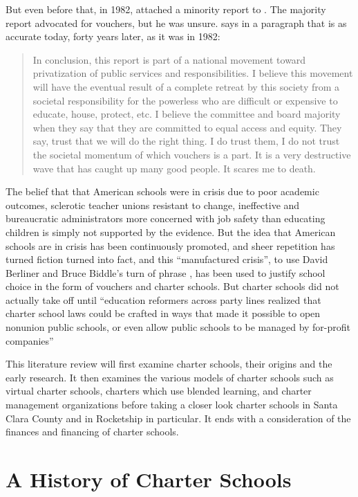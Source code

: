 But even before that, in 1982, \citeauthor{EAC1982} attached a minority report to . The majority report advocated for vouchers, but he was unsure. \citeauthor{EAC1982} says in a paragraph that is as accurate today, forty years later, as it was in 1982: 
\blockquote[{\parencite[48]{EAC1982}}][]{\SingleSpacing\vspace{-0.5\baselineskip}%
In conclusion, this report is part of a national movement toward privatization of public services and responsibilities. I believe this movement will have the eventual result of a complete retreat by this society from a societal responsibility for the powerless who are difficult or expensive to educate, house, protect, etc. I believe the committee and board majority when they say that they are committed to equal access and equity. They say, trust that we will do the right thing. I do trust them, I do not trust the societal momentum of which vouchers is a part. It is a very destructive wave that has caught up many good people. It scares me to death.}

The belief that that American schools were in crisis due to poor academic outcomes, sclerotic teacher unions resistant to change, ineffective and bureaucratic administrators more concerned with job safety than educating children is simply not supported by the evidence. But the idea that American schools are in crisis has been continuously promoted, and sheer repetition has turned fiction turned into fact, and this ``manufactured crisis'', to use David Berliner and Bruce Biddle's turn of phrase \parencite{Berliner.Biddle1997}, has been used to justify school choice in the form of vouchers and charter schools. But charter schools did not actually take off until ``education reformers across party lines realized that charter school laws could be crafted in ways that made it possible to open nonunion public schools, or even allow public schools to be managed by for-profit companies'' \parencite[172]{Goldstein2015}

This literature review will first examine charter schools, their origins and the early research. It then examines the various models of charter schools such as virtual charter schools, charters which use blended learning, and charter management organizations before taking a closer look charter schools in Santa Clara County and in Rocketship in particular. It ends with a consideration of the finances and financing of charter schools.

\section{A History of Charter Schools}\label{sec:cs-history}\indent

